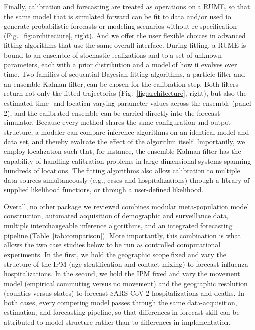 Finally, calibration and forecasting are treated as operations on a RUME, so that the same model that is simulated forward can be fit to data and/or used to generate probabilistic forecasts or modeling scenarios without re-specification (Fig.~\ref{fig:architecture}, right). 
And we offer the user flexible choices in advanced fitting algorithms that use the same overall interface.
During fitting, a RUME is bound to an ensemble of stochastic realizations and to a set of unknown parameters, each with a prior distribution and a model of how it evolves over time. 
Two families of sequential Bayesian fitting algorithms, a particle filter and an ensemble Kalman filter, can be chosen for the calibration step. 
Both filters return not only the fitted trajectories (Fig.~\ref{fig:architecture}, right), but also the estimated time- and location-varying parameter values across the ensemble (panel 2), and the calibrated ensemble can be carried directly into the forecast simulator. 
Because every method shares the same configuration and output structure, a modeler can compare inference algorithms on an identical model and data set, and thereby evaluate the effect of the algorithm itself.
Importantly, we employ localization such that, for instance, the ensemble Kalman filter has the capability of handling calibration problems in large dimensional systems spanning hundreds of locations. 
The fitting algorithms also allow calibration to multiple data sources simultaneously (e.g., cases and hospitalizations) through a library of supplied likelihood functions, or through a user-defined likelihood. 

Overall, no other package we reviewed combines modular meta-population model construction, automated acquisition of demographic and surveillance data, multiple interchangeable inference algorithms, and an integrated forecasting pipeline (Table~\ref{tab:comparison}). 
More importantly, this combination is what allows the two case studies below to be run as controlled computational experiments. 
In the first, we hold the geographic scope fixed and vary the structure of the IPM (age-stratification and contact mixing) to forecast influenza hospitalizations. 
In the second, we hold the IPM fixed and vary the movement model (empirical commuting versus no movement) and the geographic resolution (counties versus states) to forecast SARS-CoV-2 hospitalizations and deaths. 
In both cases, every competing model passes through the same data-acquisition, estimation, and forecasting pipeline, so that differences in forecast skill can be attributed to model structure rather than to differences in implementation.

